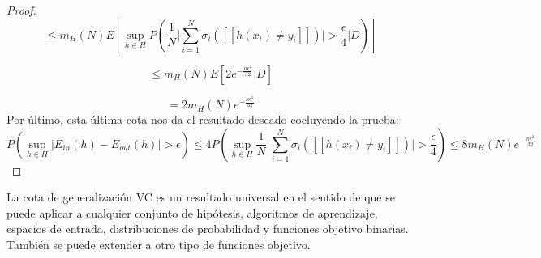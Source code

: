 \begin{proof}
\[ \leq m_{H}(N) E \left[ \sup_{h \in H} P \left( \frac{1}{N} \bigg\vert \sum_{i=1}^{N} \sigma_{i} ( [[ h(x_{i}) \neq y_{i} ]])\bigg\vert > \frac{\epsilon}{4} \bigg\vert D \right) \right] \]

\[\leq m_{H}(N) E \left[ 2 e^{ -\frac{ n\epsilon^{2} }{ 32 } } \vert D \right] \]

\[ = 2 m_{H}(N)e^{ -\frac{ n\epsilon^{2} }{ 32 } } \]
Por último, esta última cota nos da el resultado deseado cocluyendo la prueba:
\[ P \left( \sup_{h \in H} \vert E_{in}(h)-E_{out}(h) \vert >\epsilon \right) \leq 4P \left( \sup_{h \in H} \frac{1}{N} \bigg\vert \sum_{i=1}^{N} \sigma_{i} ( [[ h(x_{i}) \neq y_{i} ]])\bigg\vert > \frac{\epsilon}{4} \right) \leq 8 m_{H}(N)e^{ -\frac{ n\epsilon^{2} }{ 32 } } \] \cite{VCboundRNowak}
\end{proof} 
La cota de generalización VC es un resultado universal en el sentido de que se puede aplicar a cualquier conjunto de hipótesis, algoritmos de aprendizaje, espacios de entrada, distribuciones de probabilidad y funciones objetivo binarias. También se puede extender a otro tipo de funciones objetivo. \cite{abu2012learning}
